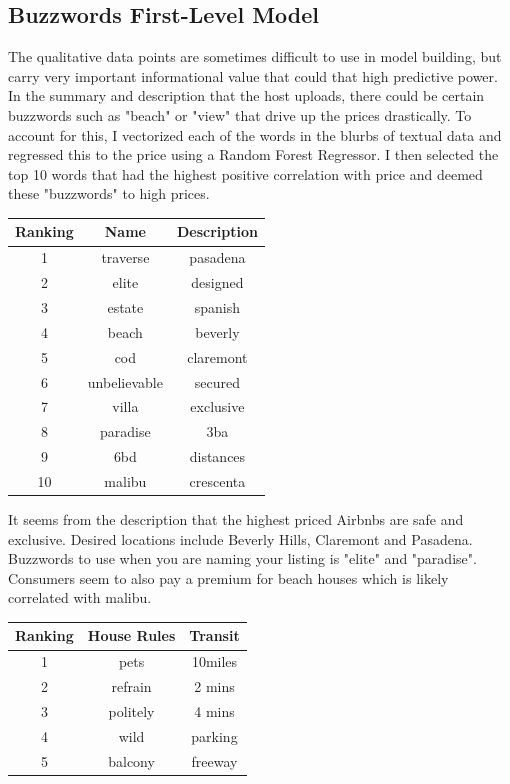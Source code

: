 \documentclass[twocolumn,10pt]{asme2ej}
\begin{document}
\subsection{Buzzwords First-Level Model}
The qualitative data points are sometimes difficult to use in model building, but carry very important informational value that could that high predictive power. In the summary and description that the host uploads, there could be certain buzzwords such as "beach" or "view" that drive up the prices drastically. To account for this, I vectorized each of the words in the blurbs of textual data and regressed this to the price using a Random Forest Regressor. I then selected the top 10 words that had the highest positive correlation with price and deemed these "buzzwords" to high prices.
\begin{center}
\begin{tabular}{ |c|c|c| } 
\hline
  {\bf{Ranking}} &{\bf{Name}} & {\bf{ Description}} \\ 

 \hline
 1 & traverse & pasadena \\ 
 \hline
 2 & elite & designed \\ 
 \hline
 3 & estate & spanish \\ 
 \hline
 4 & beach & beverly \\ 
 \hline
  5 & cod & claremont \\ 
 \hline
  6 & unbelievable & secured \\ 
 \hline
  7 & villa & exclusive \\ 
 \hline
  8 & paradise & 3ba \\ 
 \hline
  9 & 6bd & distances \\ 
 \hline
 10 & malibu & crescenta \\ 
 \hline
\end{tabular}
\end{center}
It seems from the description that the highest priced Airbnbs are safe and exclusive. Desired locations include Beverly Hills, Claremont and Pasadena. Buzzwords to use when you are naming your listing is "elite" and "paradise". Consumers seem to also pay a premium for beach houses which is likely correlated with malibu. 
\begin{center}
\begin{tabular}{ |c|c|c| } 
\hline
  {\bf{Ranking}} &{\bf{House Rules}} & {\bf{ Transit}} \\ 

 \hline
 1 & pets & 10miles \\ 
 \hline
 2 & refrain & 2 mins \\ 
 \hline
 3 & politely & 4 mins \\ 
 \hline
 4 & wild & parking \\ 
 \hline
  5 & balcony & freeway \\ 
  \hline
\end{tabular}
\end{center}
\end{document}

